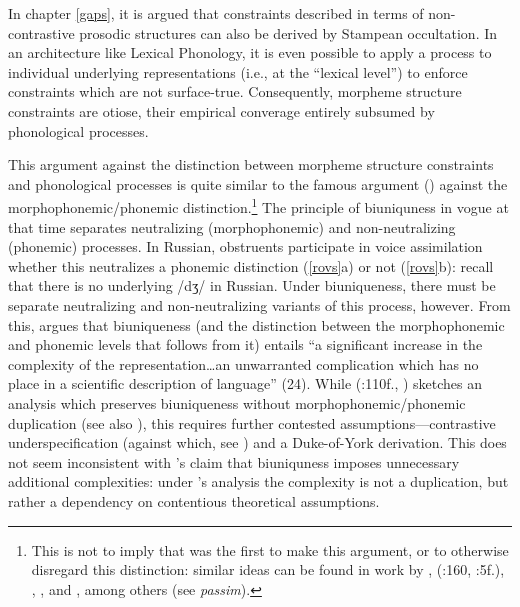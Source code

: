 In chapter \ref{gaps}, it is argued that constraints described in terms of non-contrastive prosodic structures can also be derived by Stampean occultation.
In an architecture like Lexical Phonology, it is even possible to apply a process to individual underlying representations (i.e., at the ``lexical level'') to enforce constraints which are not surface-true.
Consequently, morpheme structure constraints are otiose, their empirical converage entirely subsumed by phonological processes.

This argument against the distinction between morpheme structure constraints and phonological processes is quite similar to the famous argument (\citeyear{SPR}) against the morphophonemic/phonemic distinction.\footnote{
    This is not to imply that \citeauthor{SPR} was the first to make this argument, or to otherwise disregard this distinction: similar ideas can be found in work by \citet{Bloch1941}, \citeauthor{Bloomfield1926} (\citeyear{Bloomfield1926}:160, \citeyear{Bloomfield1962}:5f.), \citet{Chao1934}, \citet[244f.]{Hamp1953}, and \citet[47f.]{Sapir1930a}, among others (see \citealt{Anderson1985} \emph{passim}).}
The principle of biuniquness in vogue at that time separates neutralizing (morphophonemic) and non-neutralizing (phonemic) processes.
In Russian, obstruents participate in voice assimilation whether this neutralizes a phonemic distinction (\ref{rovs}a) or not (\ref{rovs}b): recall that there is no underlying /dʒ/ in Russian.
Under biuniqueness, there must be separate neutralizing and non-neutralizing variants of this process, however.
From this, \citeauthor{SPR} argues that biuniqueness (and the distinction between the morphophonemic and phonemic levels that follows from it) entails ``a significant increase in the complexity of the representation\ldots{}an unwarranted complication which has no place in a scientific description of language'' (24).
While \citeauthor{Anderson1985} (\citeyear{Anderson1985}:110f., \citeyear{Anderson2000}) sketches an analysis which preserves biuniqueness without morphophonemic/phonemic duplication (see also \citealt{Kiparsky1985}), this requires further contested assumptions---contrastive underspecification (against which, see \citealt{Steriade1995}) and a Duke-of-York derivation.
This does not seem inconsistent with \citeauthor{SPR}'s claim that biuniquness imposes unnecessary additional complexities: under \citeauthor{Anderson2000}'s analysis the complexity is not a duplication, but rather a dependency on contentious theoretical assumptions.

